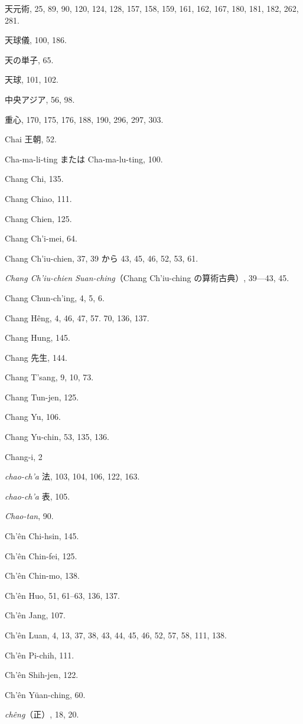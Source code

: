 \documentclass[11pt]{article}
\begin{document}
天元術, 25, 89, 90, 120, 124, 128, 157, 158, 159, 161, 162, 167, 180, 181, 182, 262, 281.\par
天球儀, 100, 186.\par
天の単子, 65.\par
天球, 101, 102.\par
中央アジア, 56, 98.\par
重心, 170, 175, 176, 188, 190, 296, 297, 303.\par
Chai 王朝, 52.\par
Cha-ma-li-ting または Cha-ma-lu-ting, 100.\par
Chang Chi, 135.\par
Chang Chiao, 111.\par
Chang Chien, 125.\par
Chang Ch'i-mei, 64.\par
Chang Ch'iu-chien, 37, 39 から 43, 45, 46, 52, 53, 61.\par
\emph{Chang Ch'iu-chien Suan-ching}（Chang Ch'iu-ching の算術古典）, 39---43, 45.\par
Chang Chun-ch'ing, 4, 5, 6.\par
Chang Hêng, 4, 46, 47, 57. 70, 136, 137.\par
Chang Hung, 145.\par
Chang 先生, 144.\par
Chang T'sang, 9, 10, 73.\par
Chang Tun-jen, 125.\par
Chang Yu, 106.\par
Chang Yu-chin, 53, 135, 136.\par
Chang-i, 2\par
\emph{chao-ch'a} 法, 103, 104, 106, 122, 163.\par
\emph{chao-ch'a} 表, 105.\par
\emph{Chao-tan}, 90.\par
Ch'ên Chi-hsin, 145.\par
Ch'ên Chin-fei, 125.\par
Ch'ên Chin-mo, 138.\par
Ch'ên Huo, 51, 61--63, 136, 137.\par
Ch'ên Jang, 107.\par
Ch'ên Luan, 4, 13, 37, 38, 43, 44, 45, 46, 52, 57, 58, 111, 138.\par
Ch'ên Pi-chih, 111.\par
Ch'ên Shih-jen, 122.\par
Ch'ên Yüan-ching, 60.\par
\emph{chêng}（正）, 18, 20.\par
\end{document}
